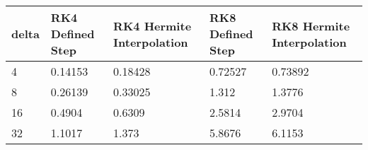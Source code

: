\begin{tabular}{lllll}
delta & RK4 Defined Step & RK4 Hermite Interpolation & RK8 Defined Step & RK8 Hermite Interpolation \\ 
\hline 
4 & 0.14153 & 0.18428 & 0.72527 & 0.73892 \\ 
8 & 0.26139 & 0.33025 & 1.312 & 1.3776 \\ 
16 & 0.4904 & 0.6309 & 2.5814 & 2.9704 \\ 
32 & 1.1017 & 1.373 & 5.8676 & 6.1153 \\ 
\hline 
\end{tabular}